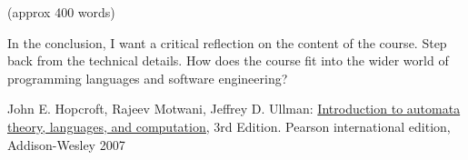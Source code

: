 \documentclass{article}
\theoremstyle{theorem}
\theoremstyle{definition}
\theoremstyle{remark}
\begin{document}
(approx 400 words)

In the conclusion, I want a critical reflection on the content of the course. Step back from the technical details. How does the course fit into the wider world of programming languages and software engineering?

\begin{thebibliography}{99}
	John E. Hopcroft, Rajeev Motwani, Jeffrey D. Ullman:
\href{http://ce.sharif.edu/courses/94-95/1/ce414-2/resources/root/Text%20Books/Automata/John%20E.%20Hopcroft,%20Rajeev%20Motwani,%20Jeffrey%20D.%20Ullman-Introduction%20to%20Automata%20Theory,%20Languages,%20and%20Computations-Prentice%20Hall%20(2006).pdf}{Introduction to automata theory, languages, and computation,} 3rd Edition. Pearson international edition, Addison-Wesley 2007

\end{thebibliography}
\end{document}
